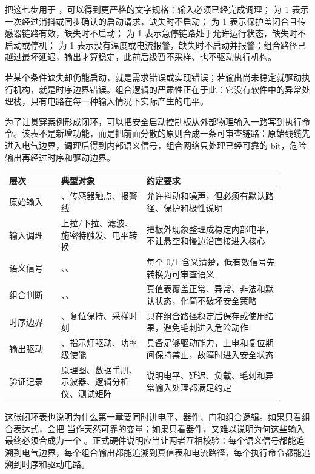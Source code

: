 把这七步用于 ，可以得到更严格的文字规格：输入必须已经完成调理； 为 1 表示一次经过消抖或同步确认的启动请求，缺失时不启动； 为 1 表示保护盖闭合且传感器链路有效，缺失时不启动； 为 1 表示急停链路处于允许运行状态，缺失时不启动或停机； 为 1 表示没有温度或电流报警，缺失时不启动并报警；组合路径已越过最坏延迟，输出才算稳定，此前后级暂不采样、也不驱动执行机构。

若某个条件缺失却仍能启动，就是需求错误或实现错误；若输出尚未稳定就驱动执行机构，就是时序边界错误。组合逻辑的严肃性正在于此：它没有软件中的异常处理栈，只有电路在每一种输入情况下实际产生的电平。

为了让贯穿案例形成闭环，可以把安全启动控制板从外部物理输入一路写到执行命令。该表不是新增功能，而是把前面分散的原则合成一条可审查链路：原始线缆先进入电气边界，调理后得到内部语义信号，组合网络只处理已经可靠的 bit，危险输出再经过时序和驱动边界。

\begin{longtable}{L{0.17\linewidth}L{0.28\linewidth}L{0.45\linewidth}}
\toprule
层次 & 典型对象 & 约定要求 \\
\midrule
原始输入 & 、传感器触点、报警线 & 允许抖动和噪声，但必须有默认路径、保护和极性说明 \\
输入调理 & 上拉/下拉、滤波、施密特触发、电平转换 & 把板外现象整理成稳定内部电平，不让悬空和慢边沿直接进入核心 \\
语义信号 & 、、 & 每个 0/1 含义清楚，低有效信号先转换为可审查语义 \\
组合判断 & 、、 & 真值表覆盖正常、异常、非法和默认状态，化简不破坏安全策略 \\
时序边界 & 、复位保持、采样时刻 & 只在组合路径稳定后保存或使用结果，避免毛刺进入危险动作 \\
输出驱动 & 、指示灯驱动、功率级使能 & 具备足够驱动能力，上电和复位期间保持禁止，故障时进入安全状态 \\
验证记录 & 原理图、数据手册、示波器、逻辑分析仪、测试矩阵 & 说明电平、延迟、负载、毛刺和异常输入处理都满足约定 \\
\bottomrule
\end{longtable}

这张闭环表也说明为什么第一章要同时讲电平、器件、门和组合逻辑。如果只看组合表达式，会把  当作天然可靠的变量；如果只看器件，又难以说明为何这些输入最终必须合成为一个 。正式硬件说明应当让两者互相校验：每个语义信号都能追溯到电气边界，每个组合输出都能追溯到真值表和电流路径，每个执行命令都能追溯到时序和驱动电路。

